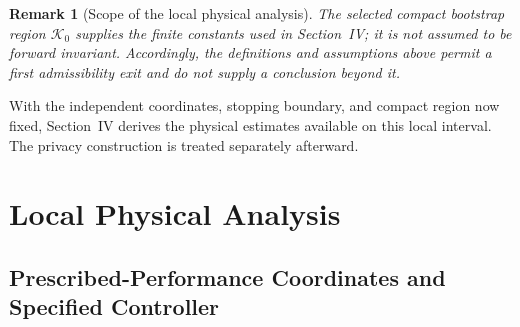 \documentclass[journal]{IEEEtran}
\newtheorem{remark}{Remark}
\begin{document}
\begin{remark}[Scope of the local physical analysis]
The selected compact bootstrap region $\mathcal K_0$ supplies the finite
constants used in Section~IV; it is not assumed to be forward invariant.
Accordingly, the definitions and assumptions above permit a first
admissibility exit and do not supply a conclusion beyond it.
\end{remark}

With the independent coordinates, stopping boundary, and compact region now
fixed, Section~IV derives the physical estimates available on this local
interval. The privacy construction is treated separately afterward.

\section{Local Physical Analysis}
\label{sec:local_physical_analysis}

\subsection{Prescribed-Performance Coordinates and Specified Controller}
\end{document}
